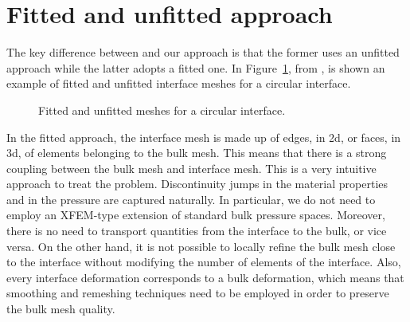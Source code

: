 \section{Fitted and unfitted approach}\label{sec:stokes_fitted_unfitted}
The key difference between \cite{spurious} and our approach is that the former
uses an unfitted approach while the latter adopts a fitted one. In
Figure~\ref{fig:fitted_unfitted}, from \cite[Fig.~1]{spurious}, is shown an
example of fitted and unfitted interface meshes for a circular interface.
\begin{figure}[htbp]
\centering
{}
\caption[Fitted and unfitted meshes]
{Fitted and unfitted meshes for a circular interface.}
\label{fig:fitted_unfitted}
\end{figure}
In the fitted approach, the interface mesh is made up of edges, in 2d, or faces,
in 3d, of elements belonging to the bulk mesh. This means that there is a strong
coupling between the bulk mesh and interface mesh. This is a very intuitive
approach to treat the problem. Discontinuity jumps in the material properties
and in the pressure are captured naturally. In particular, we do not need to
employ an XFEM-type extension of standard bulk pressure spaces. Moreover, there
is no need to transport quantities from the interface to the bulk, or vice
versa. On the other hand, it is not possible to locally refine the bulk mesh
close to the interface without modifying the number of elements of the
interface. Also, every interface deformation corresponds to a bulk deformation,
which means that smoothing and remeshing techniques need to be employed in
order to preserve the bulk mesh quality.

